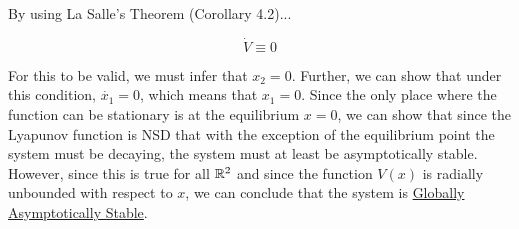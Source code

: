 \noindent By using La Salle's Theorem (Corollary 4.2)...

$$
\dot{V} \equiv 0
$$

\noindent For this to be valid, we must infer that $x_2 = 0$. Further, we can show that under this condition, $\dot{x_1}=0$, which means that $x_1 =0 $. Since the only place where the function can be stationary is at the equilibrium $x=0$, we can show that since the Lyapunov function is NSD that with the exception of the equilibrium point the system must be decaying, the system must at least be asymptotically stable. However, since this is true for all $\mathbb{R}^2$ and since the function $V(x)$ is radially unbounded with respect to $x$, we can conclude that the system is \underline{Globally Asymptotically Stable}.
